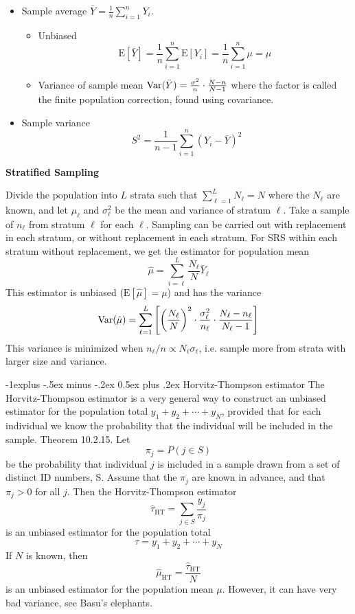 \documentclass[10pt,landscape]{article}
\makeatletter
\renewcommand{\subsection}{\@startsection{subsection}{2}{0mm}%
                                {-1explus -.5ex minus -.2ex}%
                                {0.5ex plus .2ex}%
                                {\normalfont\normalsize\bfseries}}
\newcommand{\E}{\text{E}}
\makeatother
\begin{document}
\begin{multicols*}{3}
\begin{itemize}
    \item Sample average $\bar Y=\frac{1}{n}\sum_{i=1}^nY_i$.
    \begin{itemize}
        \item Unbiased
        $$
        \E[\bar Y]=\frac{1}{n}\sum_{i=1}^n\E[Y_i]=\frac{1}{n}\sum_{i=1}^n\mu=\mu
        $$
        \item Variance of sample mean $\operatorname{Var}(\bar Y)=\frac{\sigma^2}{n}\cdot \frac{N-n}{N-1}$ where the factor is called the finite population correction, found using covariance.
    \end{itemize}
    \item Sample variance
    $$
    S^2=\frac{1}{n-1}\sum_{i=1}^n(Y_i-\bar Y)^2
    $$
\end{itemize}

\textbf{Stratified Sampling}

Divide the population into $L$ strata such that $\sum_{\ell=1}^LN_\ell=N$ where the $N_\ell$ are known, and let $\mu_\ell$ and $\sigma_\ell^2$ be the mean and variance of stratum $\ell$. Take a sample of $n_\ell$ from stratum $\ell$ for each $\ell$. Sampling can be carried out with replacement in each stratum, or without replacement in each stratum. For SRS within each stratum without replacement, we get the estimator for population mean
$$
\hat\mu=\sum_{i=\ell}^L\frac{N_\ell}{N }\bar Y_\ell
$$
This estimator is unbiased ($\E[\hat\mu]=\mu$) and has the variance
$$
\operatorname{Var}(\hat\mu)=\sum_{\ell=1}^L\left[\left(\frac{N_\ell}{N}\right)^2\cdot\frac{\sigma_\ell^2}{n_\ell}\cdot\frac{N_\ell-n_\ell}{N_\ell-1}\right]
$$
This variance is minimized when $n_\ell/n\propto N_\ell\sigma_\ell$, i.e. sample more from strata with larger size and variance.

\subsection{Horvitz-Thompson estimator}
The Horvitz-Thompson estimator is a very general way to construct an unbiased estimator for the population total $y_1+y_2+\cdots+y_N$, provided that for each individual we know the probability that the individual will be included in the sample.
Theorem 10.2.15. Let
$$
\pi_j=P(j \in S)
$$
be the probability that individual $j$ is included in a sample drawn from a set of distinct ID numbers, S. Assume that the $\pi_j$ are known in advance, and that $\pi_j>0$ for all $j$. Then the Horvitz-Thompson estimator
$$
\hat{\tau}_{\mathrm{HT}}=\sum_{j \in S} \frac{y_j}{\pi_j}
$$
is an unbiased estimator for the population total
$$
\tau=y_1+y_2+\cdots+y_N
$$
If $N$ is known, then
$$
\hat{\mu}_{\mathrm{HT}}=\frac{\hat{\tau}_{\mathrm{HT}}}{N}
$$
is an unbiased estimator for the population mean $\mu$. However, it can have very bad variance, see Basu's elephants.


\end{multicols*}
\end{document}

